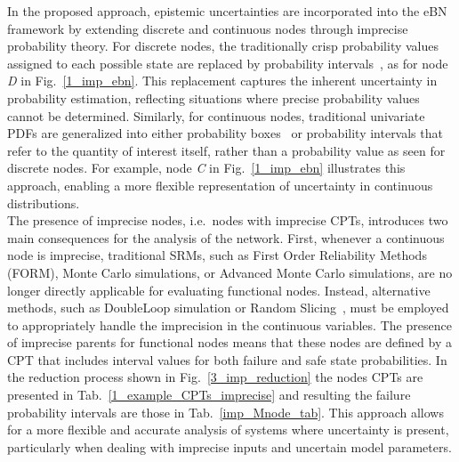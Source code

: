 In the proposed approach, epistemic uncertainties are incorporated into the eBN framework by extending discrete and continuous nodes through imprecise probability theory.
For discrete nodes, the traditionally crisp probability values assigned to each possible state are replaced by probability intervals~\cite{weichselberger_theory_2000}, as for node \textit{D} in Fig.~\ref{1_imp_ebn}. 
This replacement captures the inherent uncertainty in probability estimation, reflecting situations where precise probability values cannot be determined. Similarly, for continuous nodes, traditional univariate PDFs are generalized into either probability boxes~\cite{ferson_2003} or probability intervals that refer to the quantity of interest itself, rather than a probability value as seen for discrete nodes. 
For example, node \textit{C} in Fig.~\ref{1_imp_ebn} illustrates this approach, enabling a more flexible representation of uncertainty in continuous distributions.\\

The presence of imprecise nodes, i.e.\ nodes with imprecise CPTs, introduces two main consequences for the analysis of the network. 
First, whenever a continuous node is imprecise, traditional SRMs, such as First Order Reliability Methods (FORM), Monte Carlo simulations, or Advanced Monte Carlo simulations, are no longer directly applicable for evaluating functional nodes. 
Instead, alternative methods, such as DoubleLoop simulation or Random Slicing~\cite{ALVAREZ_randomslicing}, must be employed to appropriately handle the imprecision in the continuous variables. 
The presence of imprecise parents for functional nodes means that these nodes are defined by a CPT that includes interval values for both failure and safe state probabilities. In the reduction process shown in Fig.~\ref{3_imp_reduction} the nodes CPTs are presented in Tab.~\ref{1_example_CPTs_imprecise} and  resulting the failure probability intervals are those in Tab.~\ref{imp_Mnode_tab}. 
This approach allows for a more flexible and accurate analysis of systems where uncertainty is present, particularly when dealing with imprecise inputs and uncertain model parameters.

